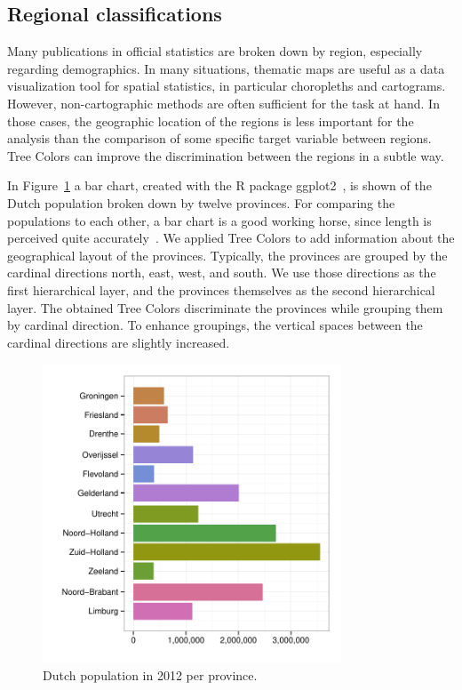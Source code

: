 \documentclass[journal]{vgtc}                %
\begin{document}




\subsection{Regional classifications}
Many publications in official statistics are broken down by region, especially regarding demographics.
In many situations, thematic maps are useful as a data visualization tool for spatial statistics, in particular choropleths and cartograms. However, non-cartographic methods are often sufficient for the task at hand. In those cases, the geographic location of the regions is less important for the analysis than the comparison of some specific target variable between regions. Tree Colors can improve the discrimination between the regions in a subtle way.

In Figure~\ref{fig:barApp} a bar chart, created with the R package ggplot2~\cite{ggplot2}, is shown of the Dutch population broken down by twelve provinces. For comparing the populations to each other, a bar chart is a good working horse, since length is perceived quite accurately~\cite{Mackinlay1986}. We applied Tree Colors to add information about the geographical layout of the provinces. Typically, the provinces are grouped by the cardinal directions north, east, west, and south. We use those directions as the first hierarchical layer, and the provinces themselves as the second hierarchical layer. The obtained Tree Colors discriminate the provinces while grouping them by cardinal direction. To enhance groupings, the vertical spaces between the cardinal directions are slightly increased.

\begin{figure}[!b]
  \centering
  \includegraphics[width=3.5in]{pop_bar.pdf}

  \caption{Dutch population in 2012 per province.}\label{fig:barApp}

\end{figure}
\end{document}
